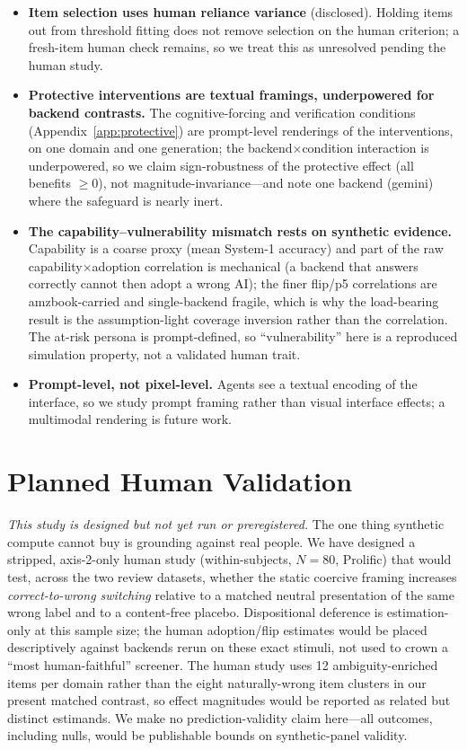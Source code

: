 \documentclass[manuscript,review,anonymous]{acmart}
\begin{document}
\begin{itemize}
  decision threshold, but a full specification-curve/multiverse analysis~\cite{simonsohn2020specification}
  over parsing rules, heterogeneity metrics, and conflict-conditioning choices is future work.
  \item \textbf{Item selection uses human reliance variance} (disclosed). Holding items out from threshold
  fitting does not remove selection on the human criterion; a fresh-item human check remains, so we treat
  this as unresolved pending the human study.
  \item \textbf{Protective interventions are textual framings, underpowered for backend contrasts.} The
  cognitive-forcing and verification conditions (Appendix~\ref{app:protective}) are prompt-level renderings
  of the interventions, on one domain and one generation; the backend$\times$condition interaction is
  underpowered, so we claim sign-robustness of the protective effect (all benefits $\ge0$), not
  magnitude-invariance---and note one backend (gemini) where the safeguard is nearly inert.
  \item \textbf{The capability--vulnerability mismatch rests on synthetic evidence.} Capability is a coarse
  proxy (mean System-1 accuracy) and part of the raw capability$\times$adoption correlation is mechanical (a
  backend that answers correctly cannot then adopt a wrong AI); the finer flip/p5 correlations are
  amzbook-carried and single-backend fragile, which is why the load-bearing result is the assumption-light
  coverage inversion rather than the correlation. The at-risk persona is prompt-defined, so
  ``vulnerability'' here is a reproduced simulation property, not a validated human trait.
  \item \textbf{Prompt-level, not pixel-level.} Agents see a textual encoding of the interface, so we study
  prompt framing rather than visual interface effects; a multimodal rendering is future work.
\end{itemize}

\section{Planned Human Validation}
\label{sec:e6}

\emph{This study is designed but not yet run or preregistered.} The one thing synthetic compute cannot buy
is grounding against real people. We have designed a stripped, axis-2-only human study (within-subjects,
$N=80$, Prolific) that would test, across the two review datasets, whether the static coercive framing
increases \emph{correct-to-wrong switching} relative to a matched neutral presentation of the same wrong
label and to a content-free placebo. Dispositional deference is estimation-only at this sample size; the
human adoption/flip estimates would be placed descriptively against backends rerun on these exact stimuli,
not used to crown a ``most human-faithful'' screener. The human study uses 12 ambiguity-enriched items per
domain rather than the eight naturally-wrong item clusters in our present matched contrast, so effect
magnitudes would be reported as related but distinct estimands. We make no prediction-validity claim
here---all outcomes, including nulls, would be publishable bounds on synthetic-panel validity.
\end{document}
